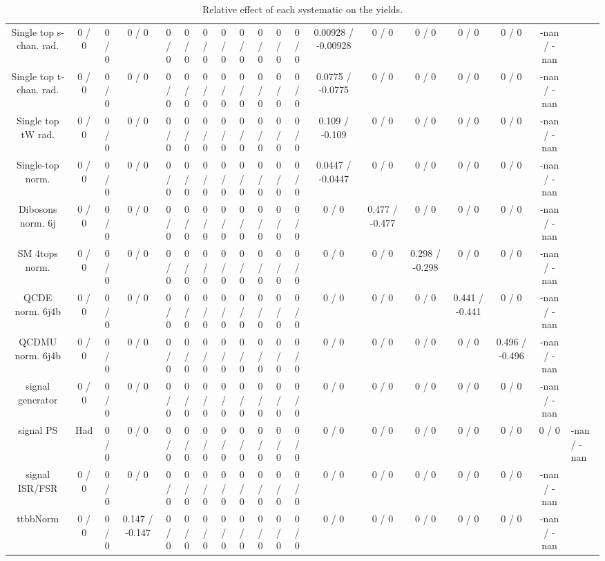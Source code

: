 \documentclass[10pt]{article}
\begin{document}
\begin{table}[htbp]
\begin{center}
\begin{tabular}{|c|c|c|c|c|c|c|c|c|c|c|c|c|c|c|c|c|c|}
  Single top s-chan. rad. & 0 / 0 & 0 / 0 & 0 / 0 & 0 / 0 & 0 / 0 & 0 / 0 & 0 / 0 & 0 / 0 & 0 / 0 & 0 / 0 & 0 / 0 & 0.00928 / -0.00928 & 0 / 0 & 0 / 0 & 0 / 0 & 0 / 0 & -nan / -nan \\ 
  Single top t-chan. rad. & 0 / 0 & 0 / 0 & 0 / 0 & 0 / 0 & 0 / 0 & 0 / 0 & 0 / 0 & 0 / 0 & 0 / 0 & 0 / 0 & 0 / 0 & 0.0775 / -0.0775 & 0 / 0 & 0 / 0 & 0 / 0 & 0 / 0 & -nan / -nan \\ 
  Single top tW rad. & 0 / 0 & 0 / 0 & 0 / 0 & 0 / 0 & 0 / 0 & 0 / 0 & 0 / 0 & 0 / 0 & 0 / 0 & 0 / 0 & 0 / 0 & 0.109 / -0.109 & 0 / 0 & 0 / 0 & 0 / 0 & 0 / 0 & -nan / -nan \\ 
  Single-top norm. & 0 / 0 & 0 / 0 & 0 / 0 & 0 / 0 & 0 / 0 & 0 / 0 & 0 / 0 & 0 / 0 & 0 / 0 & 0 / 0 & 0 / 0 & 0.0447 / -0.0447 & 0 / 0 & 0 / 0 & 0 / 0 & 0 / 0 & -nan / -nan \\ 
  Dibosons norm. 6j & 0 / 0 & 0 / 0 & 0 / 0 & 0 / 0 & 0 / 0 & 0 / 0 & 0 / 0 & 0 / 0 & 0 / 0 & 0 / 0 & 0 / 0 & 0 / 0 & 0.477 / -0.477 & 0 / 0 & 0 / 0 & 0 / 0 & -nan / -nan \\ 
  SM 4tops norm. & 0 / 0 & 0 / 0 & 0 / 0 & 0 / 0 & 0 / 0 & 0 / 0 & 0 / 0 & 0 / 0 & 0 / 0 & 0 / 0 & 0 / 0 & 0 / 0 & 0 / 0 & 0.298 / -0.298 & 0 / 0 & 0 / 0 & -nan / -nan \\ 
  QCDE norm. 6j4b & 0 / 0 & 0 / 0 & 0 / 0 & 0 / 0 & 0 / 0 & 0 / 0 & 0 / 0 & 0 / 0 & 0 / 0 & 0 / 0 & 0 / 0 & 0 / 0 & 0 / 0 & 0 / 0 & 0.441 / -0.441 & 0 / 0 & -nan / -nan \\ 
  QCDMU norm. 6j4b & 0 / 0 & 0 / 0 & 0 / 0 & 0 / 0 & 0 / 0 & 0 / 0 & 0 / 0 & 0 / 0 & 0 / 0 & 0 / 0 & 0 / 0 & 0 / 0 & 0 / 0 & 0 / 0 & 0 / 0 & 0.496 / -0.496 & -nan / -nan \\ 
  signal generator & 0 / 0 & 0 / 0 & 0 / 0 & 0 / 0 & 0 / 0 & 0 / 0 & 0 / 0 & 0 / 0 & 0 / 0 & 0 / 0 & 0 / 0 & 0 / 0 & 0 / 0 & 0 / 0 & 0 / 0 & 0 / 0 & -nan / -nan \\ 
  signal PS & Had & 0 / 0 & 0 / 0 & 0 / 0 & 0 / 0 & 0 / 0 & 0 / 0 & 0 / 0 & 0 / 0 & 0 / 0 & 0 / 0 & 0 / 0 & 0 / 0 & 0 / 0 & 0 / 0 & 0 / 0 & 0 / 0 & -nan / -nan \\ 
  signal ISR/FSR & 0 / 0 & 0 / 0 & 0 / 0 & 0 / 0 & 0 / 0 & 0 / 0 & 0 / 0 & 0 / 0 & 0 / 0 & 0 / 0 & 0 / 0 & 0 / 0 & 0 / 0 & 0 / 0 & 0 / 0 & 0 / 0 & -nan / -nan \\ 
 ttbbNorm & 0 / 0 & 0 / 0 & 0.147 / -0.147 & 0 / 0 & 0 / 0 & 0 / 0 & 0 / 0 & 0 / 0 & 0 / 0 & 0 / 0 & 0 / 0 & 0 / 0 & 0 / 0 & 0 / 0 & 0 / 0 & 0 / 0 & -nan / -nan \\ 
\hline 
\end{tabular} 
\caption{Relative effect of each systematic on the yields.} 
\end{center} 
\end{table} 
\end{document}
